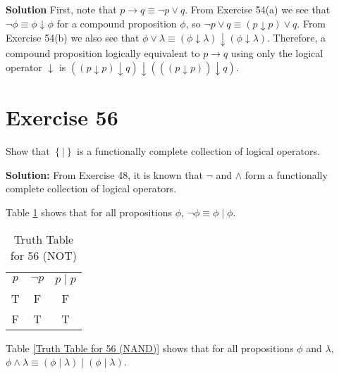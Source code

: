 \documentclass{Axon}
\begin{document}
\noindent
\textbf{Solution}
First, note that \(p \to q \equiv \lnot p \lor q\). From Exercise 54(a) we see that \(\lnot \phi \equiv \phi \downarrow \phi\) for a compound proposition \(\phi\), so \(\lnot p \lor q \equiv \left(p \downarrow p\right) \lor q\). From Exercise 54(b) we also see that \(\phi \lor \lambda \equiv \left(\phi \downarrow \lambda \right) \downarrow \left(\phi \downarrow \lambda\right)\). Therefore, a compound proposition logically equivalent to \(p \to q\) using only the logical operator \(\downarrow\) is \(\left(\left(p \downarrow p\right) \downarrow q\right) \downarrow \left(\left(\left(p \downarrow p\right)\right) \downarrow q \right)\).

\section*{Exercise 56}
Show that \(\left\{\mathbin{\mid}\right\}\) is a functionally complete collection of logical operators.

\noindent
\textbf{Solution:}
From Exercise 48, it is known that \(\lnot\) and \(\land\) form a functionally complete collection of logical operators.

Table \ref{Truth Table for 56 (NOT)} shows that for all propositions \(\phi\), \(\lnot \phi \equiv \phi \mathbin{\mid} \phi\).

\begin{table}[ht]
\centering
\begin{tabular}{c|c|c}
    \(p\) & \(\lnot p\) & \(p \mathbin{\mid} p\) \\
    T     & F           & F                      \\
    F     & T           & T
\end{tabular}
\caption{Truth Table for 56 (NOT)}
\label{Truth Table for 56 (NOT)}
\end{table}

Table \ref{Truth Table for 56 (NAND)} shows that for all propositions \(\phi\) and \(\lambda\), \(\phi \land \lambda \equiv \left(\phi \mathbin{\mid} \lambda\right) \mathbin{\mid} \left(\phi \mathbin{\mid} \lambda\right)\).
\end{document}

